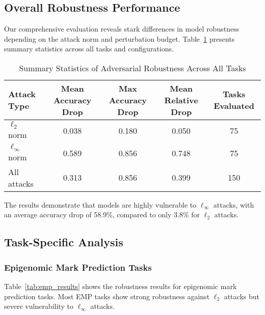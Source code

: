 \documentclass{article} %
\begin{document}
\subsection{Overall Robustness Performance}

Our comprehensive evaluation reveals stark differences in model robustness depending on the attack norm and perturbation budget. Table~\ref{tab:summary_stats} presents summary statistics across all tasks and configurations.

\begin{table}[h]
\centering
\caption{Summary Statistics of Adversarial Robustness Across All Tasks}
\label{tab:summary_stats}
\begin{tabular}{lcccc}
\toprule
\textbf{Attack Type} & \textbf{Mean Accuracy Drop} & \textbf{Max Accuracy Drop} & \textbf{Mean Relative Drop} & \textbf{Tasks Evaluated} \\
\midrule
$\ell_2$ norm & 0.038 & 0.180 & 0.050 & 75 \\
$\ell_\infty$ norm & 0.589 & 0.856 & 0.748 & 75 \\
\midrule
All attacks & 0.313 & 0.856 & 0.399 & 150 \\
\bottomrule
\end{tabular}
\end{table}

The results demonstrate that models are highly vulnerable to $\ell_\infty$ attacks, with an average accuracy drop of 58.9\%, compared to only 3.8\% for $\ell_2$ attacks.

\subsection{Task-Specific Analysis}

\subsubsection{Epigenomic Mark Prediction Tasks}

Table~\ref{tab:emp_results} shows the robustness results for epigenomic mark prediction tasks. Most EMP tasks show strong robustness against $\ell_2$ attacks but severe vulnerability to $\ell_\infty$ attacks.
\end{document}
